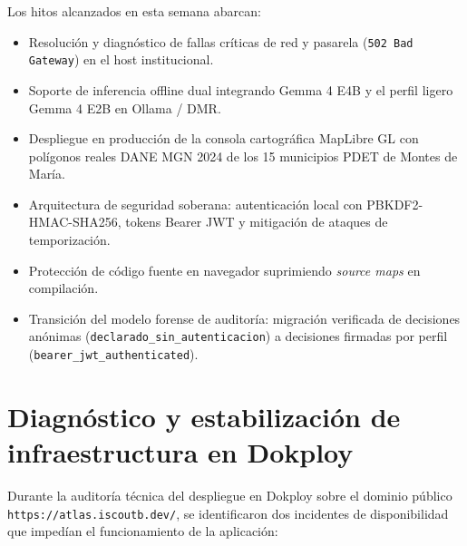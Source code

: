 \documentclass[11pt,a4paper]{article}
\begin{document}
Los hitos alcanzados en esta semana abarcan:
\begin{itemize}[leftmargin=*]
    \item Resoluci\'on y diagn\'ostico de fallas cr\'iticas de red y pasarela (\texttt{502 Bad Gateway}) en el host institucional.
    \item Soporte de inferencia offline dual integrando Gemma 4 E4B y el perfil ligero Gemma 4 E2B en Ollama / DMR.
    \item Despliegue en producci\'on de la consola cartogr\'afica MapLibre GL con pol\'igonos reales DANE MGN 2024 de los 15 municipios PDET de Montes de Mar\'ia.
    \item Arquitectura de seguridad soberana: autenticaci\'on local con PBKDF2-HMAC-SHA256, tokens Bearer JWT y mitigaci\'on de ataques de temporizaci\'on.
    \item Protecci\'on de c\'odigo fuente en navegador suprimiendo \textit{source maps} en compilaci\'on.
    \item Transici\'on del modelo forense de auditor\'ia: migraci\'on verificada de decisiones an\'onimas (\texttt{declarado\_sin\_autenticacion}) a decisiones firmadas por perfil (\texttt{bearer\_jwt\_authenticated}).
\end{itemize}

\section{Diagn\'ostico y estabilizaci\'on de infraestructura en Dokploy}

Durante la auditor\'ia t\'ecnica del despliegue en Dokploy sobre el dominio p\'ublico \texttt{https://atlas.iscoutb.dev/}, se identificaron dos incidentes de disponibilidad que imped\'ian el funcionamiento de la aplicaci\'on:
\end{document}
